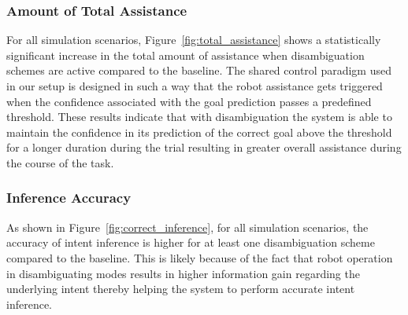 \documentclass[conference]{IEEEtran}
\begin{document}
\subsubsection{Amount of Total Assistance}

For all simulation scenarios, Figure~\ref{fig:total_assistance} shows a statistically significant increase in the total amount of assistance when disambiguation schemes are active compared to the baseline. The shared control paradigm used in our setup is designed in such a way that the robot assistance gets triggered when the confidence associated with the goal prediction passes a predefined threshold. These results indicate that with disambiguation the system is able to maintain the confidence in its prediction of the correct goal above the threshold for a longer duration during the trial resulting in greater overall assistance during the course of the task. 

\subsubsection{Inference Accuracy}

As shown in Figure~\ref{fig:correct_inference}, for all simulation scenarios, the accuracy of intent inference is higher for at least one disambiguation scheme compared to the baseline. This is likely because of the fact that robot operation in disambiguating modes results in higher information gain regarding the underlying intent thereby helping the system to perform accurate intent inference.
\end{document}
